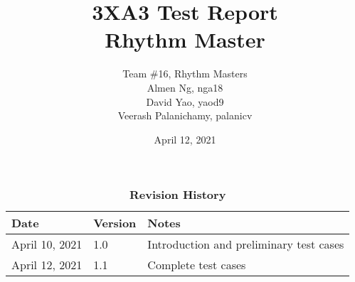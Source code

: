 \documentclass[12pt, titlepage]{article}
\title{3XA3 Test Report\\ Rhythm Master}
\author{Team \#16, Rhythm Masters
    \\ Almen Ng, nga18
    \\ David Yao, yaod9
    \\ Veerash Palanichamy, palanicv}
\date{April 12, 2021}
\begin{document}
\maketitle

\tableofcontents
\listoftables
\listoffigures

\newpage

\begin{table}[bp]
\caption{\bf Revision History}
\begin{tabularx}{\textwidth}{p{3cm}p{2cm}X}
\toprule {\bf Date} & {\bf Version} & {\bf Notes}\\
\midrule
April 10, 2021 & 1.0 & Introduction and preliminary test cases\\
April 12, 2021 & 1.1 & Complete test cases\\
\bottomrule
\end{tabularx}
\end{table}

\newpage
\clearpage

\end{document}
